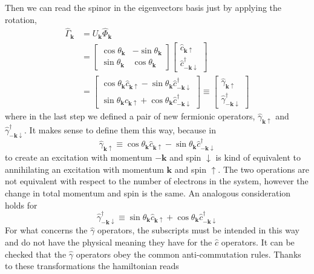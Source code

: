 Then we can read the spinor in the eigenvectors basis just by applying the rotation,
\[
\begin{aligned}
	\hat{\Gamma}_\mathbf{k} &= U_\mathbf{k} \hat{\Phi}_\mathbf{k} \\
	&= \begin{bmatrix}
		\cos \theta_\mathbf{k} & -\sin \theta_\mathbf{k} \\
		\sin \theta_\mathbf{k} & \cos \theta_\mathbf{k}
	\end{bmatrix} \begin{bmatrix}
		\hat{c}_{\mathbf{k}\uparrow} \\
		\hat{c}_{-\mathbf{k}\downarrow}^\dagger
	\end{bmatrix} \\
	&= \begin{bmatrix}
		\cos \theta_\mathbf{k} \hat{c}_{\mathbf{k}\uparrow} -\sin \theta_\mathbf{k} \hat{c}_{-\mathbf{k}\downarrow}^\dagger \\
		\sin \theta_\mathbf{k} \hat{c}_{\mathbf{k}\uparrow} + \cos \theta_\mathbf{k} \hat{c}_{-\mathbf{k}\downarrow}^\dagger
	\end{bmatrix} \equiv \begin{bmatrix}
		\hat{\gamma}_{\mathbf{k}\uparrow} \\
		\hat{\gamma}_{-\mathbf{k}\downarrow}^\dagger
	\end{bmatrix}
\end{aligned}
\]
where in the last step we defined a pair of new fermionic operators, $\hat{\gamma}_{\mathbf{k}\uparrow}$ and $\hat{\gamma}_{-\mathbf{k}\downarrow}^\dagger$. It makes sense to define them this way, because in
\[
	\hat{\gamma}_{\mathbf{k}\uparrow} \equiv \cos \theta_\mathbf{k} \hat{c}_{\mathbf{k}\uparrow} -\sin \theta_\mathbf{k} \hat{c}_{-\mathbf{k}\downarrow}^\dagger
\]
to create an excitation with momentum $-\mathbf{k}$ and spin $\downarrow$ is kind of equivalent to annihilating an excitation with momentum $\mathbf{k}$ and spin $\uparrow$. The two operations are not equivalent with respect to the number of electrons in the system, however the change in total momentum and spin is the same. An analogous consideration holds for
\[
	\hat{\gamma}_{-\mathbf{k}\downarrow}^\dagger \equiv \sin \theta_\mathbf{k} \hat{c}_{\mathbf{k}\uparrow} + \cos \theta_\mathbf{k} \hat{c}_{-\mathbf{k}\downarrow}^\dagger
\]
For what concerns the $\hat{\gamma}$ operators, the subscripts must be intended in this way and do not have the physical meaning they have for the $\hat{c}$ operators. It can be checked that the $\hat{\gamma}$ operators obey the common anti-commutation rules. Thanks to these transformations the hamiltonian reads
